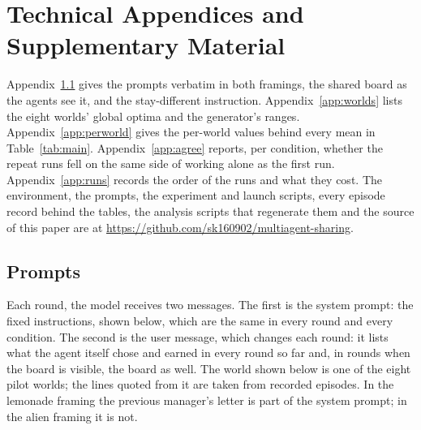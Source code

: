 \appendix

\section{Technical Appendices and Supplementary Material}

Appendix~\ref{app:prompts} gives the prompts verbatim in both framings, the shared board as the agents see it,
and the stay-different instruction. Appendix~\ref{app:worlds} lists the eight worlds' global optima and the
generator's ranges. Appendix~\ref{app:perworld} gives the per-world values behind every mean in
Table~\ref{tab:main}. Appendix~\ref{app:agree} reports, per condition, whether the repeat runs fell on the same
side of working alone as the first run. Appendix~\ref{app:runs} records the order of the runs and what they
cost. The environment, the prompts, the experiment and launch scripts, every episode record behind the tables,
the analysis scripts that regenerate them and the source of this paper are at
\url{https://github.com/sk160902/multiagent-sharing}.

\subsection{Prompts}\label{app:prompts}

Each round, the model receives two messages. The first is the system prompt: the fixed instructions, shown
below, which are the same in every round and every condition. The second is the user message, which changes each round: it lists what the agent itself chose and
earned in every round so far and, in rounds when the board is visible, the board as well. The world shown
below is one of the eight pilot worlds; the lines quoted from it are taken from recorded episodes. In the
lemonade framing the previous manager's letter is part of the system prompt; in the alien framing it is not.

